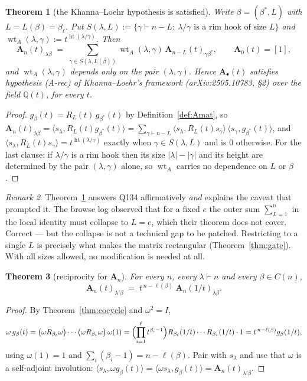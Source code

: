 \documentclass[11pt]{article}
\newtheorem{theorem}{Theorem}[section]
\theoremstyle{definition}
\theoremstyle{remark}
\newtheorem{remark}[theorem]{Remark}
\newcommand{\Q}{\mathbb{Q}}
\newcommand{\hgt}{\operatorname{ht}}
\newcommand{\wtA}{\operatorname{wt}_A}
\newcommand{\Amat}{\mathbf{A}}
\begin{document}
\begin{theorem}[the Khanna--Loehr hypothesis is satisfied]\label{thm:klhyp}
Write $\beta=(\beta^{*},L)$ with $L=L(\beta)=\beta_\ell$.  Put
$S(\lambda,L):=\{\gamma\vdash n-L:\ \lambda/\gamma\text{ is a rim hook of size }L\}$ and
$\wtA(\lambda,\gamma):=t^{\hgt(\lambda/\gamma)}$.  Then
\[
  \Amat_n(t)_{\lambda\beta}\;=\;\sum_{\gamma\in S(\lambda,L(\beta))}\wtA(\lambda,\gamma)\,
     \Amat_{n-L}(t)_{\gamma\beta^{*}},
  \qquad \Amat_0(t)=[1],
\]
and $\wtA(\lambda,\gamma)$ depends only on the pair $(\lambda,\gamma)$.  Hence $\Amat_\bullet(t)$
satisfies hypothesis \emph{(A-rec)} of Khanna--Loehr's framework
\emph{(arXiv:2505.10783, \S2)} over the field $\Q(t)$, for every $t$.
\end{theorem}

\begin{proof}
$g_\beta(t)=R_{L}(t)\,g_{\beta^{*}}(t)$ by Definition~\ref{def:Amat}, so
$\Amat_n(t)_{\lambda\beta}=\langle s_\lambda,R_L(t)g_{\beta^{*}}(t)\rangle
 =\sum_{\gamma\vdash n-L}\langle s_\lambda,R_L(t)s_\gamma\rangle\,
   \langle s_\gamma,g_{\beta^{*}}(t)\rangle$,
and $\langle s_\lambda,R_L(t)s_\gamma\rangle=t^{\hgt(\lambda/\gamma)}$ exactly when
$\gamma\in S(\lambda,L)$ and is $0$ otherwise.  For the last clause: if $\lambda/\gamma$ is a
rim hook then its size $|\lambda|-|\gamma|$ and its height are determined by the pair
$(\lambda,\gamma)$ alone, so $\wtA$ carries no dependence on $L$ or $\beta$.
\end{proof}

\begin{remark}
Theorem~\ref{thm:klhyp} answers Q134 affirmatively \emph{and} explains the caveat that
prompted it.  The browse log observed that for a fixed $e$ the outer sum $\sum_{L=1}^{n}$ in
the local identity must collapse to $L=e$, which their theorem does not cover.  Correct ---
but the collapse is not a technical gap to be patched.  Restricting to a single $L$ is
precisely what makes the matrix rectangular (Theorem~\ref{thm:gate}).  With all sizes
allowed, no modification is needed at all.
\end{remark}

\begin{theorem}[reciprocity for $\Amat_n$]\label{thm:Arecip}
For every $n$, every $\lambda\vdash n$ and every $\beta\in C(n)$,
\[
  \Amat_n(t)_{\lambda'\beta}\;=\;t^{\,n-\ell(\beta)}\;\Amat_n(1/t)_{\lambda\beta}.
\]
\end{theorem}

\begin{proof}
By Theorem~\ref{thm:cocycle} and $\omega^2=I$,
\[
 \omega\,g_\beta(t)=\bigl(\omega R_{\beta_\ell}\omega\bigr)\cdots\bigl(\omega R_{\beta_1}\omega\bigr)\,\omega(1)
 =\Bigl(\prod_{i=1}^{\ell}t^{\beta_i-1}\Bigr)R_{\beta_\ell}(1/t)\cdots R_{\beta_1}(1/t)\cdot1
 =t^{\,n-\ell(\beta)}g_\beta(1/t),
\]
using $\omega(1)=1$ and $\sum_i(\beta_i-1)=n-\ell(\beta)$.  Pair with $s_\lambda$ and use that
$\omega$ is a self-adjoint involution: $\langle s_\lambda,\omega g_\beta(t)\rangle
=\langle \omega s_\lambda,g_\beta(t)\rangle=\Amat_n(t)_{\lambda'\beta}$.
\end{proof}
\end{document}
